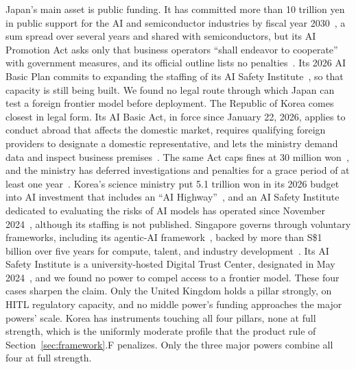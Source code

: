 \documentclass[journal]{IEEEtran}
\begin{document}
Japan's main asset is public funding. It has committed more than 10 trillion yen in public support for the AI and semiconductor industries by fiscal year 2030~\cite{japan2024kantei10tn}, a sum spread over several years and shared with semiconductors, but its AI Promotion Act asks only that business operators ``shall endeavor to cooperate'' with government measures, and its official outline lists no penalties~\cite{japan2025aipromotionact}. Its 2026 AI Basic Plan commits to expanding the staffing of its AI Safety Institute~\cite{japan2026aibasicplan}, so that capacity is still being built. We found no legal route through which Japan can test a foreign frontier model before deployment. The Republic of Korea comes closest in legal form. Its AI Basic Act, in force since January 22, 2026, applies to conduct abroad that affects the domestic market, requires qualifying foreign providers to designate a domestic representative, and lets the ministry demand data and inspect business premises~\cite{korea2025aibasicact}. The same Act caps fines at 30 million won~\cite{korea2025aibasicact}, and the ministry has deferred investigations and penalties for a grace period of at least one year~\cite{korea2026msitaiact}. Korea's science ministry put 5.1 trillion won in its 2026 budget into AI investment that includes an ``AI Highway''~\cite{korea2025msitbudget}, and an AI Safety Institute dedicated to evaluating the risks of AI models has operated since November 2024~\cite{koreaaisi2024}, although its staffing is not published. Singapore governs through voluntary frameworks, including its agentic-AI framework~\cite{imda2026agentic}, backed by more than S\$1 billion over five years for compute, talent, and industry development~\cite{singapore2024nais}. Its AI Safety Institute is a university-hosted Digital Trust Center, designated in May 2024~\cite{singapore2024dtcaisi}, and we found no power to compel access to a frontier model. These four cases sharpen the claim. Only the United Kingdom holds a pillar strongly, on HITL regulatory capacity, and no middle power's funding approaches the major powers' scale. Korea has instruments touching all four pillars, none at full strength, which is the uniformly moderate profile that the product rule of Section~\ref{sec:framework}.F penalizes. Only the three major powers combine all four at full strength.
\end{document}
